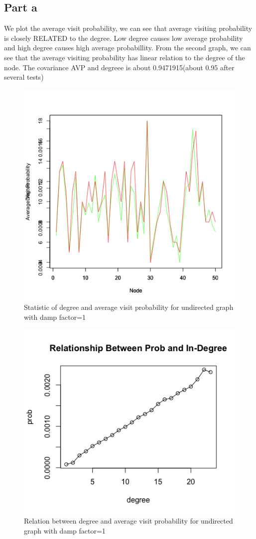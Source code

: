 \documentclass{article}
\begin{document}
\subsection{Part a}
We plot the average visit probability, we can see that average visiting probability is  closely RELATED to 
the degree. Low degree causes low average probability and high degree causes high average probabillity.
From the second graph, we can see that the average visiting probability has linear relation to the degree of the node. 
The covariance AVP and degreee is about 0.9471915(about 0.95 after several tests)
\begin{figure}[htbp]
\centering
\includegraphics[width=.6\textwidth]{p3_1.png}
\caption{Statistic of degree and average visit probability for undirected graph with damp factor=1}
\label{fig:p3_1}
\end{figure}
\begin{figure}[htbp]
\centering
\includegraphics[width=.6\textwidth]{p3_2.png}
\caption{Relation between degree and average visit probability for undirected graph with damp factor=1}
\label{fig:p3_2}
\end{figure}
\end{document}
